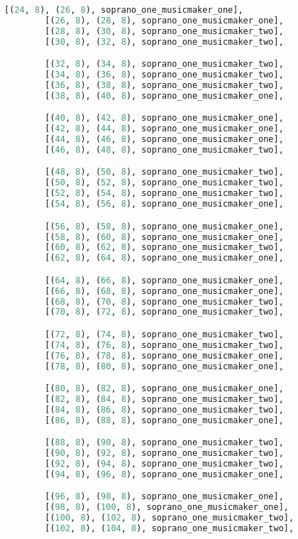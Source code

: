 \begin{lstlisting}[language=Python, caption=Invocation Source Code]
        [(24, 8), (26, 8), soprano_one_musicmaker_one],
        [(26, 8), (28, 8), soprano_one_musicmaker_one],
        [(28, 8), (30, 8), soprano_one_musicmaker_two],
        [(30, 8), (32, 8), soprano_one_musicmaker_two],

        [(32, 8), (34, 8), soprano_one_musicmaker_two],
        [(34, 8), (36, 8), soprano_one_musicmaker_two],
        [(36, 8), (38, 8), soprano_one_musicmaker_two],
        [(38, 8), (40, 8), soprano_one_musicmaker_one],

        [(40, 8), (42, 8), soprano_one_musicmaker_one],
        [(42, 8), (44, 8), soprano_one_musicmaker_one],
        [(44, 8), (46, 8), soprano_one_musicmaker_one],
        [(46, 8), (48, 8), soprano_one_musicmaker_two],

        [(48, 8), (50, 8), soprano_one_musicmaker_two],
        [(50, 8), (52, 8), soprano_one_musicmaker_two],
        [(52, 8), (54, 8), soprano_one_musicmaker_two],
        [(54, 8), (56, 8), soprano_one_musicmaker_one],

        [(56, 8), (58, 8), soprano_one_musicmaker_one],
        [(58, 8), (60, 8), soprano_one_musicmaker_one],
        [(60, 8), (62, 8), soprano_one_musicmaker_two],
        [(62, 8), (64, 8), soprano_one_musicmaker_one],

        [(64, 8), (66, 8), soprano_one_musicmaker_one],
        [(66, 8), (68, 8), soprano_one_musicmaker_one],
        [(68, 8), (70, 8), soprano_one_musicmaker_two],
        [(70, 8), (72, 8), soprano_one_musicmaker_two],

        [(72, 8), (74, 8), soprano_one_musicmaker_two],
        [(74, 8), (76, 8), soprano_one_musicmaker_two],
        [(76, 8), (78, 8), soprano_one_musicmaker_one],
        [(78, 8), (80, 8), soprano_one_musicmaker_one],

        [(80, 8), (82, 8), soprano_one_musicmaker_one],
        [(82, 8), (84, 8), soprano_one_musicmaker_two],
        [(84, 8), (86, 8), soprano_one_musicmaker_two],
        [(86, 8), (88, 8), soprano_one_musicmaker_one],

        [(88, 8), (90, 8), soprano_one_musicmaker_two],
        [(90, 8), (92, 8), soprano_one_musicmaker_two],
        [(92, 8), (94, 8), soprano_one_musicmaker_two],
        [(94, 8), (96, 8), soprano_one_musicmaker_one],

        [(96, 8), (98, 8), soprano_one_musicmaker_one],
        [(98, 8), (100, 8), soprano_one_musicmaker_one],
        [(100, 8), (102, 8), soprano_one_musicmaker_two],
        [(102, 8), (104, 8), soprano_one_musicmaker_two],


\end{lstlisting}
